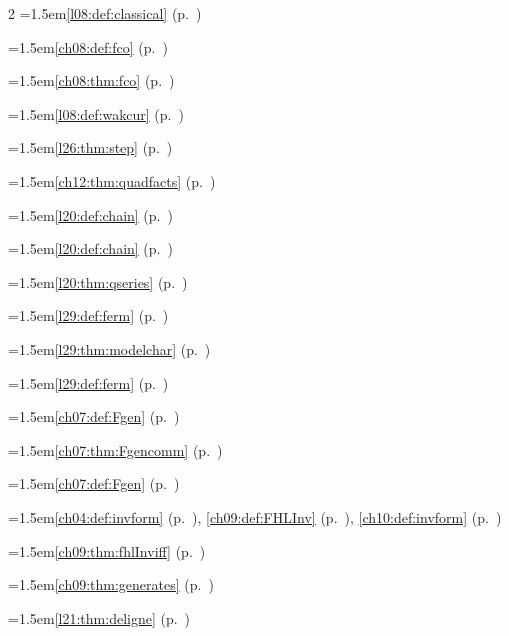 \begin{multicols}{2}
\hangindent=1.5em\quad \ref{l08:def:classical} (p.~\pageref{l08:def:classical})\par
\hangindent=1.5em\quad \ref{ch08:def:fco} (p.~\pageref{ch08:def:fco})\par
\hangindent=1.5em\quad \ref{ch08:thm:fco} (p.~\pageref{ch08:thm:fco})\par
\hangindent=1.5em\quad \ref{l08:def:wakcur} (p.~\pageref{l08:def:wakcur})\par
\hangindent=1.5em\quad \ref{l26:thm:step} (p.~\pageref{l26:thm:step})\par
\hangindent=1.5em\quad \ref{ch12:thm:quadfacts} (p.~\pageref{ch12:thm:quadfacts})\par
\hangindent=1.5em\quad \ref{l20:def:chain} (p.~\pageref{l20:def:chain})\par
\hangindent=1.5em\quad \ref{l20:def:chain} (p.~\pageref{l20:def:chain})\par
\hangindent=1.5em\quad \ref{l20:thm:qseries} (p.~\pageref{l20:thm:qseries})\par
\hangindent=1.5em\quad \ref{l29:def:ferm} (p.~\pageref{l29:def:ferm})\par
\hangindent=1.5em\quad \ref{l29:thm:modelchar} (p.~\pageref{l29:thm:modelchar})\par
\hangindent=1.5em\quad \ref{l29:def:ferm} (p.~\pageref{l29:def:ferm})\par
\hangindent=1.5em\quad \ref{ch07:def:Fgen} (p.~\pageref{ch07:def:Fgen})\par
\hangindent=1.5em\quad \ref{ch07:thm:Fgencomm} (p.~\pageref{ch07:thm:Fgencomm})\par
\hangindent=1.5em\quad \ref{ch07:def:Fgen} (p.~\pageref{ch07:def:Fgen})\par
\hangindent=1.5em\quad \ref{ch04:def:invform} (p.~\pageref{ch04:def:invform}), \ref{ch09:def:FHLInv} (p.~\pageref{ch09:def:FHLInv}), \ref{ch10:def:invform} (p.~\pageref{ch10:def:invform})\par
\hangindent=1.5em\quad \ref{ch09:thm:fhlInviff} (p.~\pageref{ch09:thm:fhlInviff})\par
\hangindent=1.5em\quad \ref{ch09:thm:generates} (p.~\pageref{ch09:thm:generates})\par
\hangindent=1.5em\quad \ref{l21:thm:deligne} (p.~\pageref{l21:thm:deligne})\par

\end{multicols}
